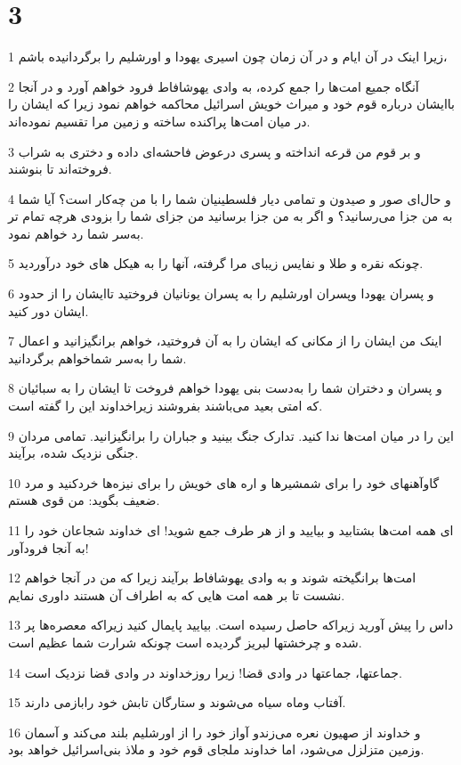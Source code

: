 \chapter{3}

\par 1 زیرا اینک در آن ایام و در آن زمان چون اسیری یهودا و اورشلیم را برگردانیده باشم،
\par 2 آنگاه جمیع امت‌ها را جمع کرده، به وادی یهوشافاط فرود خواهم آورد و در آنجا باایشان درباره قوم خود و میراث خویش اسرائیل محاکمه خواهم نمود زیرا که ایشان را در میان امت‌ها پراکنده ساخته و زمین مرا تقسیم نموده‌اند.
\par 3 و بر قوم من قرعه انداخته و پسری درعوض فاحشه‌ای داده و دختری به شراب فروخته‌اند تا بنوشند.
\par 4 و حال‌ای صور و صیدون و تمامی دیار فلسطینیان شما را با من چه‌کار است؟ آیا شما به من جزا می‌رسانید؟ و اگر به من جزا برسانید من جزای شما را بزودی هر‌چه تمام تر به‌سر شما رد خواهم نمود.
\par 5 چونکه نقره و طلا و نفایس زیبای مرا گرفته، آنها را به هیکل های خود درآوردید.
\par 6 و پسران یهودا وپسران اورشلیم را به پسران یونانیان فروختید تاایشان را از حدود ایشان دور کنید.
\par 7 اینک من ایشان را از مکانی که ایشان را به آن فروختید، خواهم برانگیزانید و اعمال شما را به‌سر شماخواهم برگردانید.
\par 8 و پسران و دختران شما را به‌دست بنی یهودا خواهم فروخت تا ایشان را به سبائیان که امتی بعید می‌باشند بفروشند زیراخداوند این را گفته است.
\par 9 این را در میان امت‌ها ندا کنید. تدارک جنگ بینید و جباران را برانگیزانید. تمامی مردان جنگی نزدیک شده، برآیند.
\par 10 گاوآهنهای خود را برای شمشیرها و اره های خویش را برای نیزه‌ها خردکنید و مرد ضعیف بگوید: من قوی هستم.
\par 11 ‌ای همه امت‌ها بشتابید و بیایید و از هر طرف جمع شوید! ای خداوند شجاعان خود را به آنجا فرودآور!
\par 12 امت‌ها برانگیخته شوند و به وادی یهوشافاط برآیند زیرا که من در آنجا خواهم نشست تا بر همه امت هایی که به اطراف آن هستند داوری نمایم.
\par 13 داس را پیش آورید زیراکه حاصل رسیده است. بیایید پایمال کنید زیراکه معصره‌ها پر شده و چرخشتها لبریز گردیده است چونکه شرارت شما عظیم است.
\par 14 جماعتها، جماعتها در وادی قضا! زیرا روزخداوند در وادی قضا نزدیک است.
\par 15 آفتاب وماه سیاه می‌شوند و ستارگان تابش خود رابازمی دارند.
\par 16 و خداوند از صهیون نعره می‌زندو آواز خود را از اورشلیم بلند می‌کند و آسمان وزمین متزلزل می‌شود، اما خداوند ملجای قوم خود و ملاذ بنی‌اسرائیل خواهد بود.
